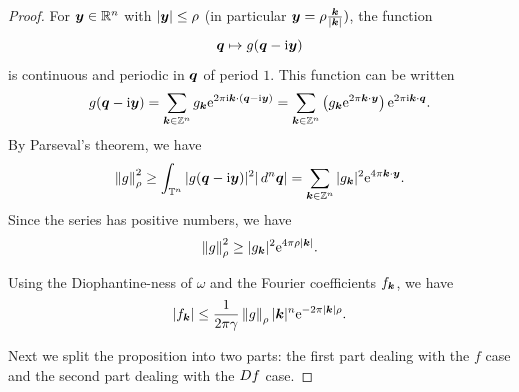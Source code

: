 \documentclass[twoside,letterpaper,11pt]{article}
\numberwithin{equation}{section}
\newcommand{\T}{\mathbb{T}}
\begin{document}
\begin{proof}
  For $\bm{y} \in \mathbb{R}^n$ with $|\bm{y}| \leq \rho$ (in particular $\bm{y} = \rho
  \frac{\bm{k}}{|\bm{k}|})$, the function
  \begin{equation*}
    \bm{q} \mapsto g(\bm{q} - \mathrm{i} \bm{y})
  \end{equation*}
  is continuous and periodic in $\bm{q}$ of period $1$.
  This function can be written
  \begin{equation*}
    g(\bm{q} - \mathrm{i} \bm{y}) = \sum_{\bm{k} \in \mathbb{Z}^n} g_{\bm{k}} \mathrm{e}^{2 \pi \mathrm{i}
      \bm{k} \cdot (\bm{q} - \mathrm{i} \bm{y})} = \sum_{\bm{k} \in \mathbb{Z}^n}
    \left(g_{\bm{k}} \mathrm{e}^{2 \pi \bm{k} \cdot \bm{y}} \right) \mathrm{e}^{2 \pi \mathrm{i} \bm{k}
      \cdot \bm{q}}.
  \end{equation*}
  By Parseval's theorem, we have
  \begin{equation*}
    \norm{g}_{\rho}^2 \geq \int_{\T^n} |g(\bp{q} - \i \bp{y})|^2 |\dif ^n
    \bp{q}| = \sum_{\bp{k} \in \Z^n} |g_{\bp{k}}|^2 \e^{4 \pi \bp{k} \cdot \bp{y}}.
  \end{equation*}
  Since the series has positive numbers, we have
  \begin{equation*}
    \norm{g}_{\rho}^2 \geq |g_{\bp{k}}|^2 \e^{4 \pi \rho|\bp{k}|}.
  \end{equation*}

  Using the Diophantine-ness of $\omega$ and the Fourier coefficients
  $f_{\bm{k}}$, we have
  \begin{equation*}
    |f_{\bp{k}}| \leq \frac{1}{2 \pi \gamma} \norm{g}_{\rho} |\bp{k}|^n \e^{-2
      \pi |\bp{k}| \rho}.
  \end{equation*}

  Next we split the proposition into two parts: the first part dealing with the
  $f$ case and the second part dealing with the $\mathop{}\!D f$ case.


\end{proof}
\end{document}
